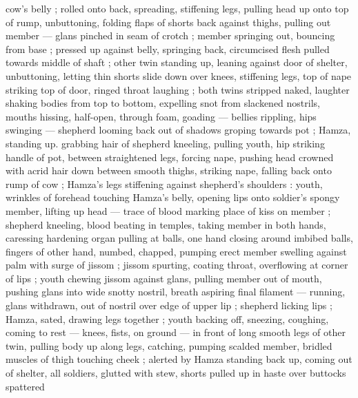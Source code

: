 cow's belly ; rolled onto back, spreading, stiffening legs, pulling head up onto top of rump, unbuttoning, folding flaps of shorts back against thighs, pulling out member --- glans pinched in seam of crotch ; member springing out, bouncing from base ; pressed up against belly, springing back, circumcised flesh pulled towards middle of shaft ; other twin standing up, leaning against door of shelter, unbuttoning, letting thin shorts slide down over knees, stiffening legs, top of nape striking top of door, ringed throat laughing ; both twins stripped naked, laughter shaking bodies from top to bottom, expelling snot from slackened nostrils, mouths hissing, half-open, through foam, goading --- bellies rippling, hips swinging --- shepherd looming back out of shadows groping towards pot ; Hamza, standing up. grabbing hair of shepherd kneeling, pulling youth, hip striking handle of pot, between straightened legs, forcing nape, pushing head crowned with acrid hair down between smooth thighs, striking nape, falling back onto rump of cow ; Hamza's legs stiffening against shepherd's shoulders : youth, wrinkles of forehead touching Hamza's belly, opening lips onto soldier's spongy member, lifting up head --- trace of blood marking place of kiss on member ; shepherd kneeling, blood beating in temples, taking member in both hands, caressing hardening organ pulling at balls, one hand closing around imbibed balls, fingers of other hand, numbed, chapped, pumping erect member swelling against palm with surge of jissom ; jissom spurting, coating throat, overflowing at corner of lips ; youth chewing jissom against glans, pulling member out of mouth, pushing glans into wide snotty nostril, breath aspiring final filament --- running, glans withdrawn, out of nostril over edge of upper lip ; shepherd licking lips ; Hamza, sated, drawing legs together ; youth backing off, sneezing, coughing, coming to rest --- knees, fists, on ground --- in front of long smooth legs of other twin, pulling body up along legs, catching, pumping scalded member, bridled muscles of thigh touching cheek ; alerted by Hamza standing back up, coming out of shelter, all soldiers, glutted with stew, shorts pulled up in haste over buttocks spattered 
